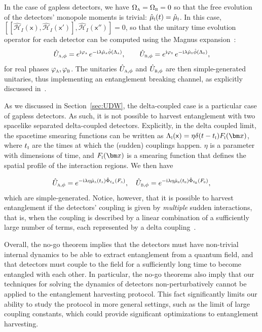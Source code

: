 \documentclass[letterpaper,12pt,titlepage,oneside,final]{book}
\newcommand{\mf}{\mathsf}%
\newcommand{\ii}{\mathrm{i}}
\newcommand{\tc}[1]{\textsc{#1}}
\begin{document}
In the case of gapless detectors, we have $\Omega_\tc{a} = \Omega_\tc{b} = 0$ so that the free evolution of the detectors' monopole moments is trivial: $\hat{\mu}_\tc{i}(t) = \hat{\mu}_\tc{i}$. In this case, $[[\hat{\mathcal{H}}_I(\mf x),\hat{\mathcal{H}}_I(\mf x')],\hat{\mathcal{H}}_I(\mf x'')] = 0$, so that the unitary time evolution operator for each detector can be computed using the Magnus expansion~\cite{HarvestingQueNemLouko,Landulfo}:
\begin{equation}
    \hat{U}_{\tc{a},\phi} = e^{\ii\varphi_\textsc{a}}\,e^{- \ii \lambda \hat{\mu}_\tc{a} \hat{\phi}(\Lambda_\tc{a})}, \quad\quad 
    \hat{U}_{\tc{b},\phi} = e^{\ii\varphi_\textsc{b}}\,e^{- \ii \lambda \hat{\mu}_\tc{b} \hat{\phi}(\Lambda_\tc{b}) },
\end{equation}
for real phases $\varphi_\textsc{a},\varphi_\textsc{b}$. The unitaries $\hat{U}_{\tc{a},\phi}$ and $\hat{U}_{\tc{b},\phi}$  are then simple-generated unitaries, thus implementing an entanglement breaking channel, as explicitly discussed in~\cite{nogo}.

As we discussed in Section~\ref{sec:UDW}, the delta-coupled case is a particular case of gapless detectors. As such, it is not possible to harvest entanglement with two spacelike separated delta-coupled detectors. Explicitly, in the delta coupled limit, the spacetime smearing functions can be written as $\Lambda_\tc{i}(\mf x) = \eta \delta(t-t_\tc{i}) F_\tc{i}(\bm x)$, where $t_\tc{i}$ are the times at which the (sudden) couplings happen. $\eta$ is a parameter with dimensions of time, and $F_\tc{i}(\bm x)$ is a smearing function that defines the spatial profile of the interaction regions. We then have 

\begin{equation}
    \hat{U}_{\tc{a},\phi} = e^{- \ii \lambda \eta \hat{\mu}_\tc{a}(t_\tc{a}) \hat{\Phi}_{t_\tc{a}}(F_\tc{a})}, \quad \hat{U}_{\tc{b},\phi} = e^{- \ii \lambda \eta \hat{\mu}_\tc{b}(t_\tc{b}) \hat{\Phi}_{t_\tc{b}}(F_\tc{b})},
\end{equation}
which are simple-generated. Notice, however, that it is possible to harvest entanglement if the detectors' coupling is given by \textit{multiple} sudden interactions, that is, when the coupling is described by a linear combination of a sufficiently large number of terms, each represented by a delta coupling~\cite{JoseEdu2024Nonperturbative}.


Overall, the no-go theorem implies that the detectors must have non-trivial internal dynamics to be able to extract entanglement from a quantum field, and that detectors must couple to the field for a sufficiently long time to become entangled with each other. In particular, the no-go theorems also imply that our techniques for solving the dynamics of detectors non-perturbatively cannot be applied to the entanglement harvesting protocol. This fact significantly limits our ability to study the protocol in more general settings, such as the limit of large coupling constants, which could provide significant optimizations to entanglement harvesting.
\end{document}
